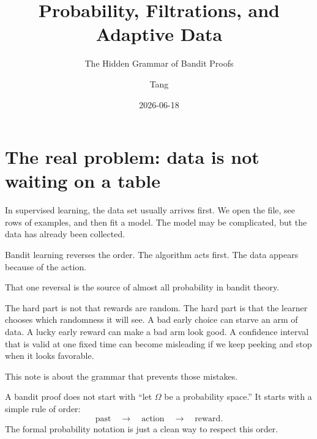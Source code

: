 \documentclass[en,nofont,11pt]{elegantbook}
\title{Probability, Filtrations, and Adaptive Data}
\subtitle{The Hidden Grammar of Bandit Proofs}
\author{Tang}
\institute{Tang's Machine Learning Blog}
\date{2026-06-18}
\begin{document}
\maketitle
\frontmatter
\tableofcontents
\mainmatter

\chapter{The real problem: data is not waiting on a table}

In supervised learning, the data set usually arrives first.  We open the file, see rows of examples, and then fit a model.  The model may be complicated, but the data has already been collected.

Bandit learning reverses the order.  The algorithm acts first.  The data appears because of the action.

That one reversal is the source of almost all probability in bandit theory.

\begin{center}
\end{center}

The hard part is not that rewards are random.  The hard part is that the learner chooses which randomness it will see.  A bad early choice can starve an arm of data.  A lucky early reward can make a bad arm look good.  A confidence interval that is valid at one fixed time can become misleading if we keep peeking and stop when it looks favorable.

This note is about the grammar that prevents those mistakes.

\begin{keyidea}
A bandit proof does not start with ``let $\Omega$ be a probability space.''  It starts with a simple rule of order:
\[
\text{past} \quad \longrightarrow \quad \text{action} \quad \longrightarrow \quad \text{reward}.
\]
The formal probability notation is just a clean way to respect this order.
\end{keyidea}
\end{document}
